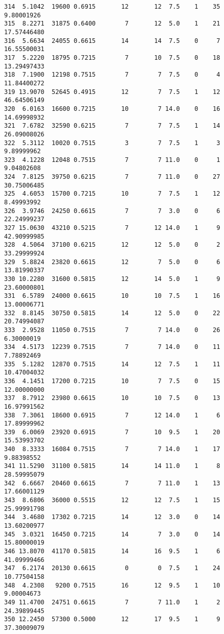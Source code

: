 \documentclass[
  letterpaper,
  DIV=11,
  numbers=noendperiod]{scrreprt}
\begin{document}
\begin{verbatim}
314  5.1042  19600 0.6915       12       12  7.5    1    35  9.80001926
315  8.2271  31875 0.6400        7       12  5.0    1    21 17.57446480
316  5.6634  24055 0.6615       14       14  7.5    0     7 16.55500031
317  5.2220  18795 0.7215        7       10  7.5    0    18 13.29497433
318  7.1900  12198 0.7515        7        7  7.5    0     4 11.84400272
319 13.9070  52645 0.4915       12        7  7.5    1    12 46.64506149
320  6.0163  16600 0.7215       10        7 14.0    0    16 14.69998932
321  7.6782  32590 0.6215        7        7  7.5    1    14 26.09008026
322  5.3112  10020 0.7515        3        7  7.5    1     3  9.89999962
323  4.1228  12048 0.7515        7        7 11.0    0     1  9.04802608
324  7.8125  39750 0.6215        7        7 11.0    0    27 30.75006485
325  4.6053  15700 0.7215       10        7  7.5    1    12  8.49993992
326  3.9746  24250 0.6615        7        7  3.0    0     6 22.24999237
327 15.0630  43210 0.5215        7       12 14.0    1     9 42.90999985
328  4.5064  37100 0.6215       12       12  5.0    0     2 33.29999924
329  5.8824  23820 0.6615       12        7  5.0    0     6 13.81990337
330 10.2280  31600 0.5815       12       14  5.0    1     9 23.60000801
331  6.5789  24000 0.6615       10       10  7.5    1    16 13.00006771
332  8.8145  30750 0.5815       14       12  5.0    0    22 20.74994087
333  2.9528  11050 0.7515        7        7 14.0    0    26  6.30000019
334  4.5173  12239 0.7515        7        7 14.0    0    11  7.78892469
335  5.1282  12870 0.7515       14       12  7.5    1    11 10.47004032
336  4.1451  17200 0.7215       10        7  7.5    0    15 12.00000000
337  8.7912  23980 0.6615       10       10  7.5    0    13 16.97991562
338  7.3061  18600 0.6915        7       12 14.0    1     6 17.89999962
339  6.0069  23920 0.6915        7       10  9.5    1    20 15.53993702
340  8.3333  16084 0.7515        7        7 14.0    1    17  9.88398552
341 11.5290  31100 0.5815       14       14 11.0    1     8 28.59995079
342  6.6667  20460 0.6615        7        7 11.0    1    13 17.66001129
343  8.6806  36000 0.5515       12       12  7.5    1    15 25.99991798
344  3.4680  17302 0.7215       14       12  3.0    0    14 13.60200977
345  3.0321  16450 0.7215       14        7  3.0    0    14 15.80000019
346 13.8070  41170 0.5815       14       16  9.5    1     6 41.09999466
347  6.2174  20130 0.6615        0        0  7.5    1    24 10.77504158
348  4.2308   9200 0.7515       16       12  9.5    1    10  9.00004673
349 11.4700  24751 0.6615        7        7 11.0    1     2 24.39899445
350 12.2450  57300 0.5000       12       17  9.5    1     9 37.30009079

\end{verbatim}
\end{document}
